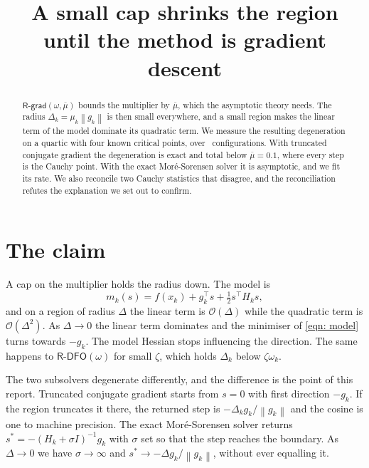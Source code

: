 \documentclass[11pt,a4paper]{article}
\title{A small cap shrinks the region until the method is gradient descent}
\author{}
\date{}
\providecommand{\calO}{{\mathcal{O}}}
\providecommand{\norm}[1]{\left \lVert #1 \right \rVert}
\providecommand{\Rdfo}{\textsf{R-DFO}}
\providecommand{\Rgrad}{\textsf{R-grad}}
\begin{document}
\maketitle

\begin{abstract}
$\Rgrad(\omega,\overline{\mu})$ bounds the multiplier by $\overline{\mu}$, which
the asymptotic theory needs. The radius $\Delta_k = \mu_k\norm{g_k}$ is then
small everywhere, and a small region makes the linear term of the model dominate
its quadratic term. We measure the resulting degeneration on a quartic with four
known critical points, over \NConfigs\ configurations. With truncated conjugate
gradient the degeneration is exact and total below $\overline{\mu} = 0.1$, where
every step is the Cauchy point. With the exact Mor\'e-Sorensen solver it is
asymptotic, and we fit its rate. We also reconcile two Cauchy statistics that
disagree, and the reconciliation refutes the explanation we set out to confirm.
\end{abstract}

\section{The claim}\label{sec: claim}

A cap on the multiplier holds the radius down. The model is
\begin{equation}
  m_k(s) = f(x_k) + g_k^{\top}s + \tfrac12 s^{\top}H_k s ,
  \label{eqn: model}
\end{equation}
and on a region of radius $\Delta$ the linear term is $\calO(\Delta)$ while the
quadratic term is $\calO(\Delta^2)$. As $\Delta \to 0$ the linear term dominates
and the minimiser of \eqref{eqn: model} turns towards $-g_k$. The model Hessian
stops influencing the direction. The same happens to $\Rdfo(\omega)$ for small
$\zeta$, which holds $\Delta_k$ below $\zeta\omega_k$.

The two subsolvers degenerate differently, and the difference is the point of
this report. Truncated conjugate gradient starts from $s = 0$ with first
direction $-g_k$. If the region truncates it there, the returned step is
$-\Delta_k g_k/\norm{g_k}$ and the cosine is one to machine precision. The exact
Mor\'e-Sorensen solver returns $s^* = -(H_k + \sigma I)^{-1}g_k$ with $\sigma$
set so that the step reaches the boundary. As $\Delta \to 0$ we have
$\sigma \to \infty$ and $s^* \to -\Delta g_k/\norm{g_k}$, without ever equalling
it.
\end{document}
